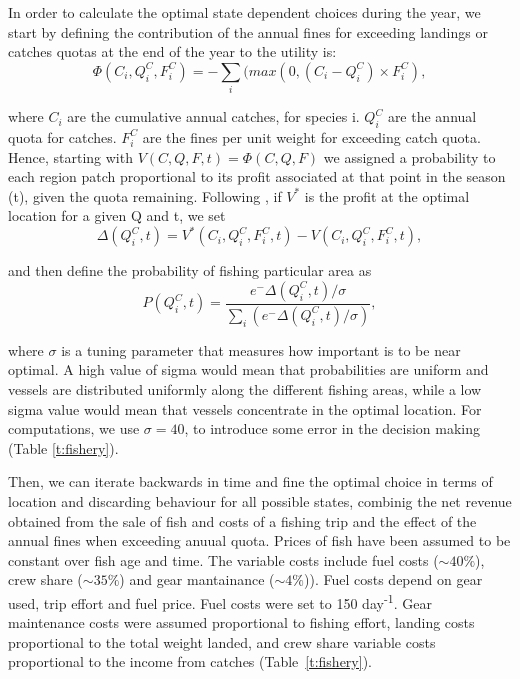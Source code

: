 \documentclass[12pt,oneline,a4paper,numbib]{ouparticle}
\begin{document}
In order to calculate the optimal state dependent choices during the year, we start by defining the contribution of the annual fines for exceeding landings or catches quotas at the end of the year to the utility is: 
\begin{equation*}
\Phi (C_i, Q_i^C, F_i^C) = -\sum_{i} (max(0, (C_i - Q_i^C)\times F_i^C),
\end{equation*}

where $C_i$ are the cumulative annual catches, for species i. $Q_i^C$ are the annual quota for catches. $F_i^C$ are the fines per unit weight for exceeding catch quota. Hence, starting with $V (C, Q, F, t) = \Phi (C, Q, F)$ we assigned a probability to each region patch proportional to its profit associated at that point in the season (t), given the quota remaining. Following \cite{Dowling2011}, if $V^\ast$ is the profit at the optimal location for a given Q and t, we set
\begin{equation*}
\Delta (Q_i^C, t) = V^\ast (C_i, Q_i^C, F_i^C, t) - V (C_i, Q_i^C, F_i^C, t),
\end{equation*}

and then define the probability of fishing particular area as
\begin{equation*}
P (Q_i^C, t) = \frac{e^-\Delta (Q_i^C, t)/\sigma} {\sum_{i}(e^-\Delta (Q_i^C, t)/\sigma)},
\end{equation*}

where $\sigma$ is a tuning parameter that measures how important is to be near optimal.  A high value of sigma would mean that probabilities are uniform and vessels are distributed uniformly along the different fishing areas, while a low sigma value would mean that vessels concentrate in the optimal location. For computations, we use $\sigma = 40$, to introduce some error in the decision making (Table \ref{t:fishery}).

Then, we can iterate backwards in time and fine the optimal choice in terms of location and discarding behaviour for all possible states, combinig the net revenue obtained from the sale of fish and costs of a fishing trip and the effect of the annual fines when exceeding anuual quota. Prices of fish have been assumed to be constant over fish age and time. The variable costs include fuel costs ($\sim{40\%}$), crew share ($\sim{35\%}$) and gear mantainance ($\sim{4\%}$)). Fuel costs depend on gear used, trip effort and fuel price. Fuel costs were set to 150 \texteuro day\textsuperscript{-1}. Gear maintenance costs were assumed proportional to fishing effort, landing costs proportional to the total weight landed, and crew share variable costs proportional to the income from catches (Table~\ref{t:fishery}).
\end{document}
